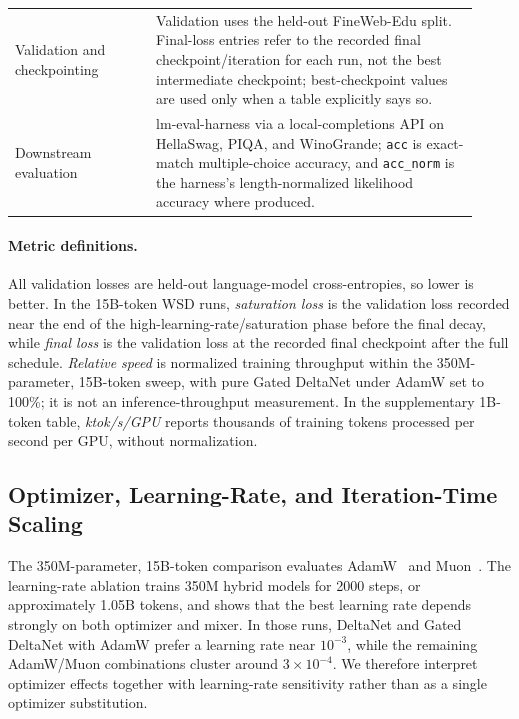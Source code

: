 \documentclass{article}
\begin{document}
\begin{table}[tbp]
\begin{tabular}{p{0.28\linewidth}p{0.64\linewidth}}
        Validation and checkpointing & Validation uses the held-out FineWeb-Edu split. Final-loss entries refer to the recorded final checkpoint/iteration for each run, not the best intermediate checkpoint; best-checkpoint values are used only when a table explicitly says so. \\
        Downstream evaluation & lm-eval-harness via a local-completions API on HellaSwag, PIQA, and WinoGrande; \texttt{acc} is exact-match multiple-choice accuracy, and \texttt{acc\_norm} is the harness's length-normalized likelihood accuracy where produced.\\
        \bottomrule
    \end{tabular}
\end{table}

\paragraph{Metric definitions.}
All validation losses are held-out language-model cross-entropies, so lower is better. In the 15B-token WSD runs, \emph{saturation loss} is the validation loss recorded near the end of the high-learning-rate/saturation phase before the final decay, while \emph{final loss} is the validation loss at the recorded final checkpoint after the full schedule. \emph{Relative speed} is normalized training throughput within the 350M-parameter, 15B-token sweep, with pure Gated DeltaNet under AdamW set to 100\%; it is not an inference-throughput measurement. In the supplementary 1B-token table, \emph{ktok/s/GPU} reports thousands of training tokens processed per second per GPU, without normalization.

\subsection{Optimizer, Learning-Rate, and Iteration-Time Scaling}

The 350M-parameter, 15B-token comparison evaluates AdamW~\cite{loshchilov2019decoupled} and Muon~\cite{jordan2024muon}. The learning-rate ablation trains 350M hybrid models for 2000 steps, or approximately 1.05B tokens, and shows that the best learning rate depends strongly on both optimizer and mixer. In those runs, DeltaNet and Gated DeltaNet with AdamW prefer a learning rate near $10^{-3}$, while the remaining AdamW/Muon combinations cluster around $3 \times 10^{-4}$. We therefore interpret optimizer effects together with learning-rate sensitivity rather than as a single optimizer substitution.
\end{document}
